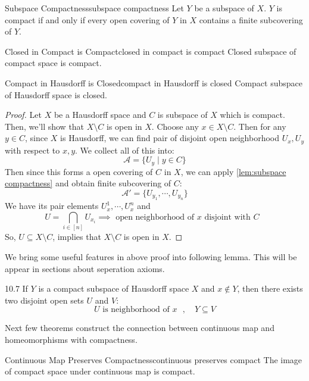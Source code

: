 \documentclass[12pt, a4paper, twoside]{article}
\newcommand{\CA}{{\mathcal {A}}} \newcommand{\CB}{{\mathcal {B}}}
\theoremstyle{plain}
\begin{document}
\begin{lem}{Subspace Compactness}{subspace compactness}
    Let $Y$ be a subspace of $X$. $Y$ is compact if and only if 
    every open covering of $Y$ in $X$ contains a finite subcovering of $Y$. 
\end{lem}

\begin{thm}{Closed in Compact is Compact}{closed in compact is compact}
    Closed subspace of compact space is compact. 
\end{thm}

\begin{thm}{Compact in Hausdorff is Closed}{compact in Hausdorff is closed}
    Compact subspace of Hausdorff space is closed.
\end{thm}

\begin{proof}
    Let $X$ be a Hausdorff space and $C$ is subspace of $X$ which is compact. 
    Then, we'll show that $X \setminus C$ is open in $X$. 
    Choose any $x \in X \setminus C$. 
    Then for any $y \in C$, since $X$ is Hausdorff, we can find pair of disjoint open neighborhood $U_x, U_y$ with respect to $x, y$. 
    We collect all of this into: 
    \[\CA = \{U_y \mid y \in C\}\]
    Then since this forms a open covering of $C$ in $X$, we can apply \ref{lem:subspace compactness} and 
    obtain finite subcovering of $C$: 
    \[\CA' = \{U_{y_1}, \cdots, U_{y_n}\}\]
    We have its pair elements $U_{x}^1, \cdots, U_{x}^n$ and 
    \[U = \bigcap_{i \in [n]} U_{x_i} \implies \text{ open neighborhood of $x$ disjoint with $C$ }\]
    So, $U \subseteq X \setminus C$, implies that $X \setminus C$ is open in $X$. 
\end{proof}

We bring some useful features in above proof into following lemma. This will be appear in sections about seperation axioms. 

\begin{lem}{}{10.7}
    If $Y$ is a compact subspace of Hausdorff space $X$ and $x \notin Y$, 
    then there exists two disjoint open sets $U$ and $V$: 
    \[U \text{ is neighborhood of $x$ }, \quad Y \subseteq V\]
\end{lem}

Next few theorems construct the connection between continuous map and homeomorphisms with compactness.

\begin{thm}{Continuous Map Preserves Compactness}{continuous preserves compact}
    The image of compact space under continuous map is compact. 
\end{thm}
\end{document}
